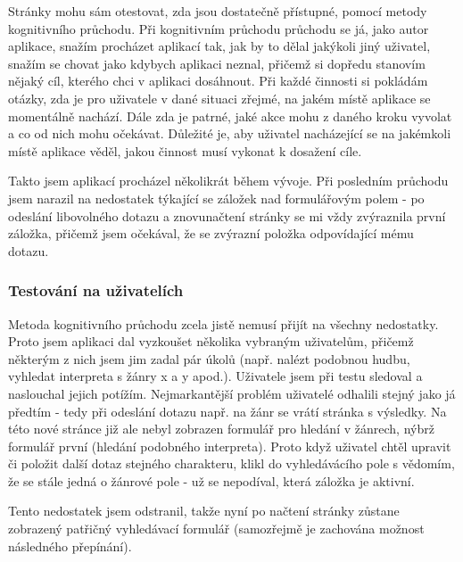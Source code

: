Stránky mohu sám otestovat, zda jsou dostatečně přístupné, pomocí metody kognitivního průchodu.
Při kognitivním průchodu průchodu se já, jako autor aplikace, snažím procházet aplikací tak, jak by to dělal jakýkoli jiný uživatel, snažím se chovat jako kdybych aplikaci neznal, přičemž si dopředu stanovím nějaký cíl, kterého chci v aplikaci dosáhnout.
Při každé činnosti si pokládám otázky, zda je pro uživatele v dané situaci zřejmé, na jakém místě aplikace se momentálně nachází. Dále zda je patrné, jaké akce mohu z daného kroku vyvolat a co od nich mohu očekávat.
Důležité je, aby uživatel nacházející se na jakémkoli místě aplikace věděl, jakou činnost musí vykonat k dosažení cíle.

Takto jsem aplikací procházel několikrát během vývoje.
Při posledním průchodu jsem narazil na nedostatek týkající se záložek nad formulářovým polem - po odeslání libovolného dotazu a znovunačtení stránky se mi vždy zvýraznila první záložka, přičemž jsem očekával, že se zvýrazní položka odpovídající mému dotazu.

\subsubsection{Testování na uživatelích}

Metoda kognitivního průchodu zcela jistě nemusí přijít na všechny nedostatky. 
Proto jsem aplikaci dal vyzkoušet několika vybraným uživatelům, přičemž některým z nich jsem jim zadal pár úkolů (např. nalézt podobnou hudbu, vyhledat interpreta s žánry x a y apod.).
Uživatele jsem při testu sledoval a naslouchal jejich potížím. Nejmarkantější problém uživatelé odhalili stejný jako já předtím - tedy při odeslání dotazu např. na žánr se vrátí stránka s výsledky. Na této nové stránce již ale nebyl zobrazen formulář pro hledání v žánrech, nýbrž formulář první (hledání podobného interpreta).
Proto když uživatel chtěl upravit či položit další dotaz stejného charakteru, klikl do vyhledávácího pole s vědomím, že se stále jedná o žánrové pole - už se nepodíval, která záložka je aktivní. 

Tento nedostatek jsem odstranil, takže nyní po načtení stránky zůstane zobrazený patřičný vyhledávací formulář (samozřejmě je zachována možnost následného přepínání).